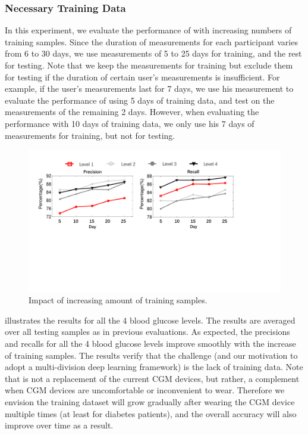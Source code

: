 \subsubsection{Necessary Training Data}
In this experiment, we evaluate the performance of \sysname with increasing numbers of training samples.
Since the duration of measurements for each participant varies from 6 to 30 days, we use measurements of 5 to 25 days for training, and the rest for testing.
Note that we keep the measurements for training but exclude them for testing if the duration of certain user's measurements is insufficient.
For example, if the user's measurements last for 7 days, we use his measurement to evaluate the performance of using 5 days of training data, and test on the measurements of the remaining 2 days.
However, when evaluating the performance with 10 days of training data, we only use his 7 days of measurements for training, but not for testing.

\begin{figure}[h]
  \centering
  \includegraphics[width=0.8\columnwidth]{./img/performance_under_days1.pdf}
  \caption{Impact of increasing amount of training samples.}
  \label{fig:per_under_train_days}
\end{figure}

 illustrates the results for all the 4 blood glucose levels.
The results are averaged over all testing samples as in previous evaluations.
As expected, the precisions and recalls for all the 4 blood glucose levels improve smoothly with the increase of training samples.
The results verify that the challenge (and our motivation to adopt a multi-division deep learning framework) is the lack of training data.
Note that \sysname is not a replacement of the current CGM devices, but rather, a complement when CGM devices are uncomfortable or inconvenient to wear.
Therefore we envision the training dataset will grow gradually after wearing the CGM device multiple times (at least for diabetes patients), and the overall accuracy will also improve over time as a result.



